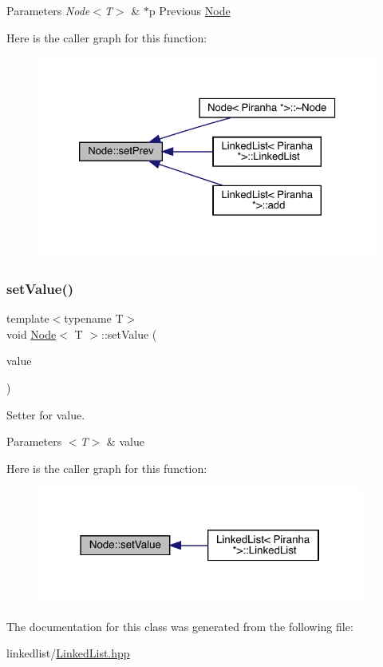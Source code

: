 \begin{DoxyParams}{Parameters}
{\em Node$<$\+T$>$} & $\ast$p Previous \mbox{\hyperlink{class_node}{Node}} \\
\hline
\end{DoxyParams}
Here is the caller graph for this function\+:\nopagebreak
\begin{figure}[H]
\begin{center}
\leavevmode
\includegraphics[width=326pt]{class_node_ac4a26ab24a7cfb8b9577d5b6d152a1dc_icgraph}
\end{center}
\end{figure}
\mbox{\label{class_node_afdabc78643a5cbab194de94274fa4f8d}} 
\subsubsection{\texorpdfstring{set\+Value()}{setValue()}}
{\footnotesize\ttfamily template$<$typename T$>$ \\
void \mbox{\hyperlink{class_node}{Node}}$<$ T $>$\+::set\+Value (\begin{DoxyParamCaption}\item[{T}]{value }\end{DoxyParamCaption})\hspace{0.3cm}{\ttfamily [inline]}}



Setter for value. 


\begin{DoxyParams}{Parameters}
{\em $<$\+T$>$} & value \\
\hline
\end{DoxyParams}
Here is the caller graph for this function\+:\nopagebreak
\begin{figure}[H]
\begin{center}
\leavevmode
\includegraphics[width=304pt]{class_node_afdabc78643a5cbab194de94274fa4f8d_icgraph}
\end{center}
\end{figure}


The documentation for this class was generated from the following file\+:\begin{DoxyCompactItemize}
\item 
linkedlist/\mbox{\hyperlink{_linked_list_8hpp}{Linked\+List.\+hpp}}\end{DoxyCompactItemize}
